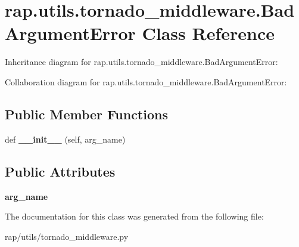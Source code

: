 \hypertarget{classrap_1_1utils_1_1tornado__middleware_1_1BadArgumentError}{}\section{rap.\+utils.\+tornado\+\_\+middleware.\+Bad\+Argument\+Error Class Reference}
\label{classrap_1_1utils_1_1tornado__middleware_1_1BadArgumentError}


Inheritance diagram for rap.\+utils.\+tornado\+\_\+middleware.\+Bad\+Argument\+Error\+:


Collaboration diagram for rap.\+utils.\+tornado\+\_\+middleware.\+Bad\+Argument\+Error\+:
\subsection*{Public Member Functions}
\begin{DoxyCompactItemize}
\item 
\mbox{\label{classrap_1_1utils_1_1tornado__middleware_1_1BadArgumentError_a2454a8699bd91ae5989b13f90dea3fa3}} 
def {\bfseries \+\_\+\+\_\+init\+\_\+\+\_\+} (self, arg\+\_\+name)
\end{DoxyCompactItemize}
\subsection*{Public Attributes}
\begin{DoxyCompactItemize}
\item 
\mbox{\label{classrap_1_1utils_1_1tornado__middleware_1_1BadArgumentError_a68e649a57a0f29ef364be85ea020fa6a}} 
{\bfseries arg\+\_\+name}
\end{DoxyCompactItemize}


The documentation for this class was generated from the following file\+:\begin{DoxyCompactItemize}
\item 
rap/utils/tornado\+\_\+middleware.\+py\end{DoxyCompactItemize}
